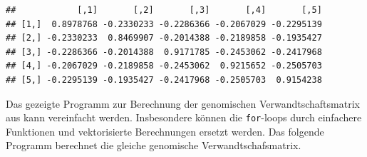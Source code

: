 \documentclass[]{book}
\newenvironment{Shaded}{\begin{snugshade}}{\end{snugshade}}
\newcommand{\KeywordTok}[1]{\textcolor[rgb]{0.13,0.29,0.53}{\textbf{{#1}}}}
\newcommand{\DataTypeTok}[1]{\textcolor[rgb]{0.13,0.29,0.53}{{#1}}}
\newcommand{\DecValTok}[1]{\textcolor[rgb]{0.00,0.00,0.81}{{#1}}}
\newcommand{\FloatTok}[1]{\textcolor[rgb]{0.00,0.00,0.81}{{#1}}}
\newcommand{\StringTok}[1]{\textcolor[rgb]{0.31,0.60,0.02}{{#1}}}
\newcommand{\CommentTok}[1]{\textcolor[rgb]{0.56,0.35,0.01}{\textit{{#1}}}}
\newcommand{\OtherTok}[1]{\textcolor[rgb]{0.56,0.35,0.01}{{#1}}}
\newcommand{\NormalTok}[1]{{#1}}
\begin{document}
\begin{verbatim}
##            [,1]       [,2]       [,3]       [,4]       [,5]
## [1,]  0.8978768 -0.2330233 -0.2286366 -0.2067029 -0.2295139
## [2,] -0.2330233  0.8469907 -0.2014388 -0.2189858 -0.1935427
## [3,] -0.2286366 -0.2014388  0.9171785 -0.2453062 -0.2417968
## [4,] -0.2067029 -0.2189858 -0.2453062  0.9215652 -0.2505703
## [5,] -0.2295139 -0.1935427 -0.2417968 -0.2505703  0.9154238
\end{verbatim}

Das gezeigte Programm zur Berechnung der genomischen
Verwandtschaftsmatrix aus \citep{CV2013} kann vereinfacht werden.
Insbesondere können die \texttt{for}-loops durch einfachere Funktionen
und vektorisierte Berechnungen ersetzt werden. Das folgende Programm
berechnet die gleiche genomische Verwandtschafsmatrix.

\begin{Shaded}
\end{Shaded}
\end{document}
